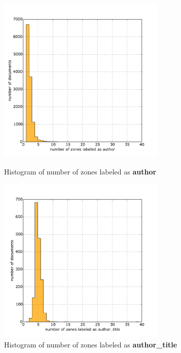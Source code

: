 \begin{figure}
\centering
\begin{minipage}[t!]{0.48\linewidth}
  \includegraphics[width=8cm]{plots/author_histogram}
  \caption{Histogram of number of zones labeled as \textbf{author}}
  \label{fig:author_histogram}
\end{minipage}
\quad
\begin{minipage}[t!]{0.48\linewidth}
  \includegraphics[width=8cm]{plots/author_title_histogram}
  \caption{Histogram of number of zones labeled as \textbf{author\_title}}
  \label{fig:author_title_histogram}
\end{minipage}
\end{figure}

